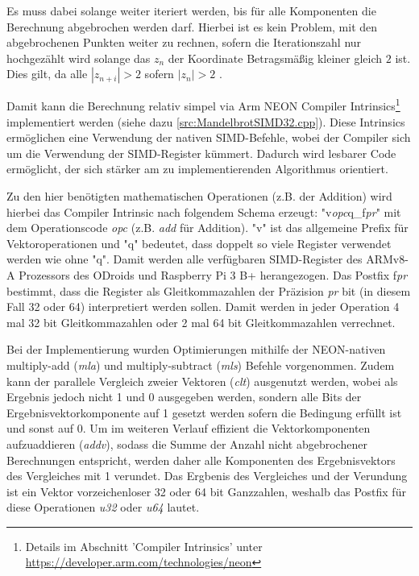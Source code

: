 Es muss dabei solange weiter iteriert werden, bis für alle Komponenten die Berechnung abgebrochen werden darf.
Hierbei ist es kein Problem, mit den abgebrochenen Punkten weiter zu rechnen, sofern die
Iterationszahl nur hochgezählt wird solange das $z_n$ der Koordinate Betragsmäßig kleiner gleich $2$ ist.
Dies gilt, da alle $|z_{n+i}| > 2$ sofern $|z_n| > 2$ \cite{424331}.

\begin{figure}
	
\end{figure}

Damit kann die Berechnung relativ simpel via Arm NEON Compiler Intrinsics\footnote{Details im Abschnitt 'Compiler Intrinsics' unter \url{https://developer.arm.com/technologies/neon}} implementiert werden (siehe dazu \autoref{src:MandelbrotSIMD32.cpp}).
Diese Intrinsics ermöglichen eine Verwendung der nativen SIMD-Befehle, wobei der Compiler sich um die Verwendung der SIMD-Register kümmert.
Dadurch wird lesbarer Code ermöglicht, der sich stärker am zu implementierenden Algorithmus orientiert.

Zu den hier benötigten mathematischen Operationen (z.B. der Addition) wird hierbei das Compiler Intrinsic nach folgendem Schema erzeugt:
"v\textit{opc}q\_f\textit{pr}" mit dem Operationscode \textit{opc} (z.B. \textit{add} für Addition).
"v" ist das allgemeine Prefix für Vektoroperationen und "q" bedeutet, dass doppelt so viele Register verwendet werden wie ohne "q".
Damit werden alle verfügbaren SIMD-Register des ARMv8-A Prozessors des ODroids und Raspberry Pi 3 B+ herangezogen.
Das Postfix f\textit{pr} bestimmt, dass die Register als Gleitkommazahlen der Präzision \textit{pr} bit (in diesem Fall 32 oder 64) interpretiert werden sollen.
Damit werden in jeder Operation 4 mal 32 bit Gleitkommazahlen oder 2 mal 64 bit Gleitkommazahlen verrechnet.

Bei der Implementierung wurden Optimierungen mithilfe der NEON-nativen multiply-add (\textit{mla}) und multiply-subtract (\textit{mls}) Befehle vorgenommen.
Zudem kann der parallele Vergleich zweier Vektoren (\textit{clt}) ausgenutzt werden, wobei als Ergebnis jedoch nicht 1 und 0 ausgegeben werden,
sondern alle Bits der Ergebnisvektorkomponente auf 1 gesetzt werden sofern die Bedingung erfüllt ist und sonst auf 0.
Um im weiteren Verlauf effizient die Vektorkomponenten aufzuaddieren (\textit{addv}), sodass die Summe der Anzahl nicht abgebrochener Berechnungen entspricht,
werden daher alle Komponenten des Ergebnisvektors des Vergleiches mit 1 verundet.
Das Ergbenis des Vergleiches und der Verundung ist ein Vektor vorzeichenloser 32 oder 64 bit Ganzzahlen, weshalb das
Postfix für diese Operationen \textit{u32} oder \textit{u64} lautet.

